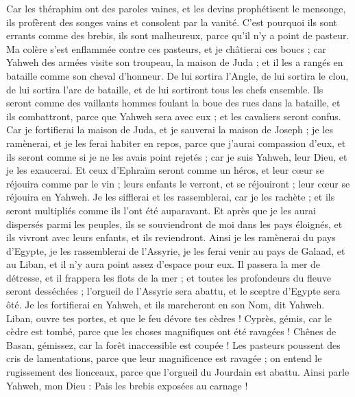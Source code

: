 \begin{multicols}{2}
Car les théraphim ont des paroles vaines, et les devins prophétisent le mensonge, ils profèrent des songes vains et consolent par la vanité. C'est pourquoi ils sont errants comme des brebis, ils sont malheureux, parce qu'il n'y a point de pasteur.
Ma colère s'est enflammée contre ces pasteurs, et je châtierai ces boucs ; car Yahweh des armées visite son troupeau, la maison de Juda ; et il les a rangés en bataille comme son cheval d'honneur.
De lui sortira l'Angle, de lui sortira le clou, de lui sortira l'arc de bataille, et de lui sortiront tous les chefs ensemble.
Ils seront comme des vaillants hommes foulant la boue des rues dans la bataille, et ils combattront, parce que Yahweh sera avec eux ; et les cavaliers seront confus.
Car je fortifierai la maison de Juda, et je sauverai la maison de Joseph ; je les ramènerai, et je les ferai habiter en repos, parce que j'aurai compassion d'eux, et ils seront comme si je ne les avais point rejetés ; car je suis Yahweh, leur Dieu, et je les exaucerai.
Et ceux d'Ephraïm seront comme un héros, et leur cœur se réjouira comme par le vin ; leurs enfants le verront, et se réjouiront ; leur cœur se réjouira en Yahweh.
Je les sifflerai et les rassemblerai, car je les rachète ; et ils seront multipliés comme ils l'ont été auparavant.
Et après que je les aurai dispersés parmi les peuples, ils se souviendront de moi dans les pays éloignés, et ils vivront avec leurs enfants, et ils reviendront.
Ainsi je les ramènerai du pays d'Egypte, je les rassemblerai de l'Assyrie, je les ferai venir au pays de Galaad, et au Liban, et il n'y aura point assez d'espace pour eux.
Il passera la mer de détresse, et il frappera les flots de la mer ; et toutes les profondeurs du fleuve seront desséchées ; l'orgueil de l'Assyrie sera abattu, et le sceptre d'Egypte sera ôté.
Je les fortifierai en Yahweh, et ils marcheront en son Nom, dit Yahweh.
\VerseOne{}Liban, ouvre tes portes, et que le feu dévore tes cèdres !
Cyprès, gémis, car le cèdre est tombé, parce que les choses magnifiques ont été ravagées ! Chênes de Basan, gémissez, car la forêt inaccessible est coupée !
Les pasteurs poussent des cris de lamentations, parce que leur magnificence est ravagée ; on entend le rugissement des lionceaux, parce que l'orgueil du Jourdain est abattu.
Ainsi parle Yahweh, mon Dieu : Pais les brebis exposées au carnage !

\end{multicols}
